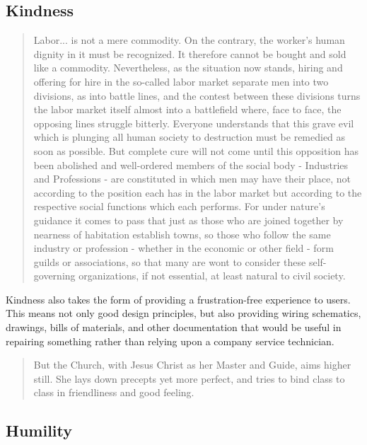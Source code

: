 \documentclass[letterpaper]{article}
\begin{document}
\subsection{Kindness}

\begin{quote}
  Labor... is not a mere commodity. On the contrary, the worker's human dignity in it must be recognized. It therefore cannot be bought and sold like a commodity. Nevertheless, as the situation now stands, hiring and offering for hire in the so-called labor market separate men into two divisions, as into battle lines, and the contest between these divisions turns the labor market itself almost into a battlefield where, face to face, the opposing lines struggle bitterly. Everyone understands that this grave evil which is plunging all human society to destruction must be remedied as soon as possible. But complete cure will not come until this opposition has been abolished and well-ordered members of the social body - Industries and Professions - are constituted in which men may have their place, not according to the position each has in the labor market but according to the respective social functions which each performs. For under nature's guidance it comes to pass that just as those who are joined together by nearness of habitation establish towns, so those who follow the same industry or profession - whether in the economic or other field - form guilds or associations, so that many are wont to consider these self-governing organizations, if not essential, at least natural to civil society.
\end{quote}

Kindness also takes the form of providing a frustration-free experience to users. This means not only good design principles, but also providing wiring schematics, drawings, bills of materials, and other documentation that would be useful in repairing something rather than relying upon a company service technician.


\begin{quote}
  But the Church, with Jesus Christ as her Master and Guide, aims higher still. She lays down precepts yet more perfect, and tries to bind class to class in friendliness and good feeling.
\end{quote}

\subsection{Humility}
\end{document}
